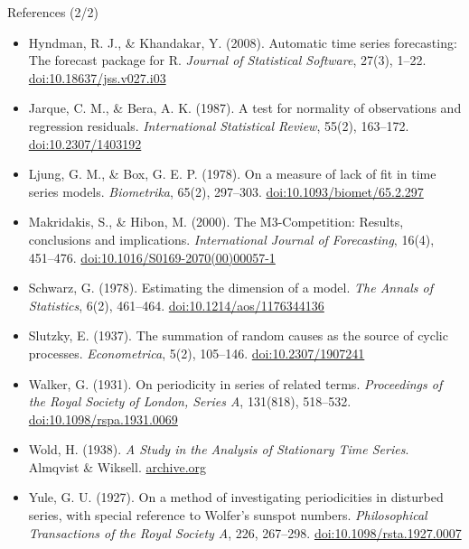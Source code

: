 \begin{frame}{References (2/2)}
\itemsize{\scriptsize}
\begin{itemize}
    \item Hyndman, R. J., \& Khandakar, Y. (2008). Automatic time series forecasting: The forecast package for R. \textit{Journal of Statistical Software}, 27(3), 1--22. \href{https://doi.org/10.18637/jss.v027.i03}{doi:10.18637/jss.v027.i03}
    \item Jarque, C. M., \& Bera, A. K. (1987). A test for normality of observations and regression residuals. \textit{International Statistical Review}, 55(2), 163--172. \href{https://doi.org/10.2307/1403192}{doi:10.2307/1403192}
    \item Ljung, G. M., \& Box, G. E. P. (1978). On a measure of lack of fit in time series models. \textit{Biometrika}, 65(2), 297--303. \href{https://doi.org/10.1093/biomet/65.2.297}{doi:10.1093/biomet/65.2.297}
    \item Makridakis, S., \& Hibon, M. (2000). The M3-Competition: Results, conclusions and implications. \textit{International Journal of Forecasting}, 16(4), 451--476. \href{https://doi.org/10.1016/S0169-2070(00)00057-1}{doi:10.1016/S0169-2070(00)00057-1}
    \item Schwarz, G. (1978). Estimating the dimension of a model. \textit{The Annals of Statistics}, 6(2), 461--464. \href{https://doi.org/10.1214/aos/1176344136}{doi:10.1214/aos/1176344136}
    \item Slutzky, E. (1937). The summation of random causes as the source of cyclic processes. \textit{Econometrica}, 5(2), 105--146. \href{https://doi.org/10.2307/1907241}{doi:10.2307/1907241}
    \item Walker, G. (1931). On periodicity in series of related terms. \textit{Proceedings of the Royal Society of London, Series A}, 131(818), 518--532. \href{https://doi.org/10.1098/rspa.1931.0069}{doi:10.1098/rspa.1931.0069}
    \item Wold, H. (1938). \textit{A Study in the Analysis of Stationary Time Series}. Almqvist \& Wiksell. \href{https://archive.org/details/in.ernet.dli.2015.262214}{archive.org}
    \item Yule, G. U. (1927). On a method of investigating periodicities in disturbed series, with special reference to Wolfer's sunspot numbers. \textit{Philosophical Transactions of the Royal Society A}, 226, 267--298. \href{https://doi.org/10.1098/rsta.1927.0007}{doi:10.1098/rsta.1927.0007}
\end{itemize}
\end{frame}


